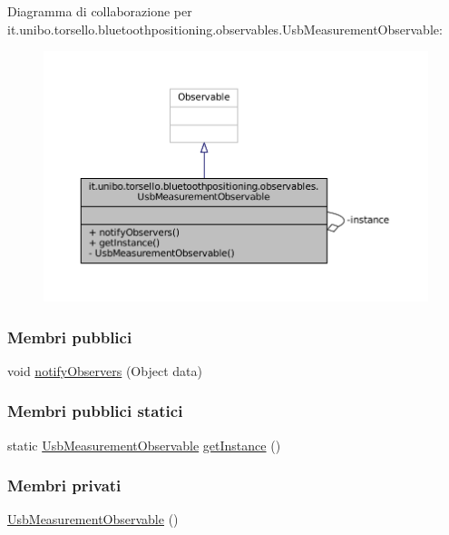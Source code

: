 Diagramma di collaborazione per it.\+unibo.\+torsello.\+bluetoothpositioning.\+observables.\+Usb\+Measurement\+Observable\+:
\nopagebreak
\begin{figure}[H]
\begin{center}
\leavevmode
\includegraphics[width=350pt]{classit_1_1unibo_1_1torsello_1_1bluetoothpositioning_1_1observables_1_1UsbMeasurementObservable__coll__graph}
\end{center}
\end{figure}
\subsubsection*{Membri pubblici}
\begin{DoxyCompactItemize}
\item 
void \hyperlink{classit_1_1unibo_1_1torsello_1_1bluetoothpositioning_1_1observables_1_1UsbMeasurementObservable_abcb4f86ee4b212c3dbc0a814e989ab73_abcb4f86ee4b212c3dbc0a814e989ab73}{notify\+Observers} (Object data)
\end{DoxyCompactItemize}
\subsubsection*{Membri pubblici statici}
\begin{DoxyCompactItemize}
\item 
static \hyperlink{classit_1_1unibo_1_1torsello_1_1bluetoothpositioning_1_1observables_1_1UsbMeasurementObservable}{Usb\+Measurement\+Observable} \hyperlink{classit_1_1unibo_1_1torsello_1_1bluetoothpositioning_1_1observables_1_1UsbMeasurementObservable_aff4f89490f3f2c11ca4feea933d12d88_aff4f89490f3f2c11ca4feea933d12d88}{get\+Instance} ()
\end{DoxyCompactItemize}
\subsubsection*{Membri privati}
\begin{DoxyCompactItemize}
\item 
\hyperlink{classit_1_1unibo_1_1torsello_1_1bluetoothpositioning_1_1observables_1_1UsbMeasurementObservable_acd610e92f8d8dc3bcf9ff7543c2ff21a_acd610e92f8d8dc3bcf9ff7543c2ff21a}{Usb\+Measurement\+Observable} ()
\end{DoxyCompactItemize}
